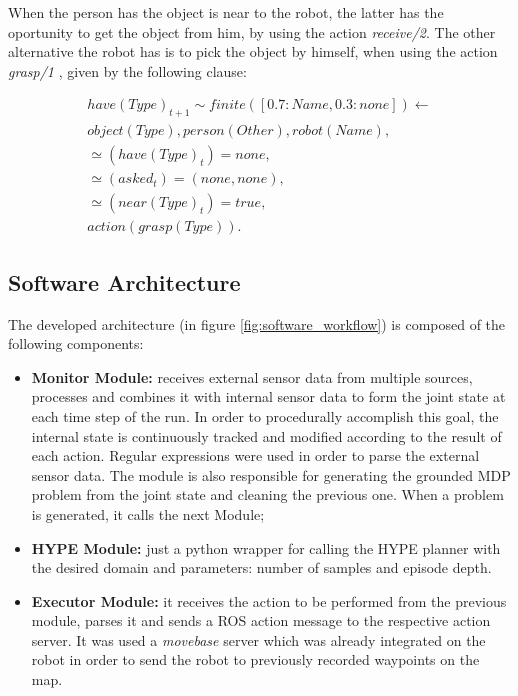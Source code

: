 When the person has the object is near to the robot, the latter has the oportunity to get the object 
from him, by using the action \textit{receive/2}. The other alternative the robot has is to pick the 
object by himself, when using the action \textit{grasp/1} , given by the following clause:

\begin{align*} 
    have(Type)_{t+1} \sim finite([0.7:Name, 0.3:none]) \leftarrow \\
    object(Type), person(Other), robot(Name), \\
    \simeq(have(Type)_t) = none, \\
    \simeq(asked_t) = (none, none), \\
    \simeq(near(Type)_t) = true, \\
    action(grasp(Type)).
\end{align*}

\subsection{Software Architecture}
The developed architecture (in figure \ref{fig:software_workflow}) is composed of the following components:
\begin{itemize}
	\item \textbf{Monitor Module:} receives external sensor data from multiple 
    sources, 
    processes and combines it with internal sensor data to form the joint state 
    at each time step of the run. In order to procedurally accomplish this goal, 
    the internal state is continuously tracked and modified according to the 
    result of each action. Regular expressions were used in order to parse the
    external sensor data. The module is also responsible for generating the
    grounded MDP problem from the joint state and cleaning the previous one. 
    When a problem is generated, it calls the next Module;
    \item \textbf{HYPE Module:} just a python wrapper for calling the HYPE planner
    with the desired domain and parameters: number of samples and episode depth.
    \item \textbf{Executor Module:} it receives the action to be performed from 
    the previous module, parses it and sends a ROS action message to the respective
    action server. It was used a \textit{movebase} server which was already
    integrated on the robot in order to send the robot to previously recorded 
    waypoints on the map. 
\end{itemize}

